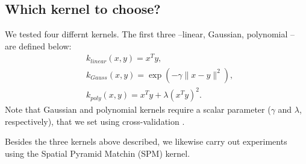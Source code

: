 

\subsection{Which kernel to choose?}
We tested four differnt kernels. The first three --linear, Gaussian, polynomial -- are defined below:
\begin{align}
    &k_{linear}(x,y) = x^Ty, \label{k:lin}\\
    &k_{Gauss}(x,y) = \exp(-\gamma\|x-y \|^2), \label{k:rbf}\\
    &k_{poly}(x,y) = x^Ty+\lambda(x^Ty)^2. \label{k:poly}
\end{align}
Note that Gaussian and polynomial kernels require a scalar parameter ($\gamma$ and $\lambda$, respectively), that we set using cross-validation .

Besides the three kernels above described, we likewise carry out experiments using the Spatial Pyramid Matchin (SPM) kernel.


